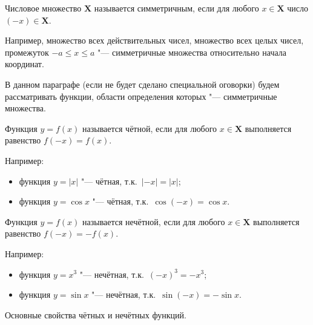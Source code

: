 \begin{Def}
Числовое множество $\mathbf{X}$ называется симметричным, если для любого
$x \in \mathbf{X}$ число $(-x) \in \mathbf{X}$.
\end{Def}

Например, множество всех действительных чисел, множество всех целых чисел,
промежуток $-a \leqslant x \leqslant a$ "--- симметричные множества
относительно начала координат.

В данном параграфе (если не будет сделано специальной оговорки) будем
рассматривать функции, области определения которых "---
симметричные множества.

\begin{Def}
Функция $y = f(x)$ называется чётной, если для любого $x \in \mathbf{X}$
выполняется равенство $f(-x) = f(x)$.
\end{Def}
Например:
\begin{itemize}
\item функция $y = |x|$ "--- чётная, т.к.\ $|-x| = |x|$;
\item функция $y = \cos x$ "--- чётная, т.к.\ $\cos (-x) = \cos x$.
\end{itemize}

\begin{Def}
Функция $y = f(x)$ называется нечётной, если для любого $x \in \mathbf{X}$
выполняется равенство $f(-x) = -f(x)$.
\end{Def}
Например:
\begin{itemize}
\item функция $y = x^{3}$ "--- нечётная, т.к.\ $(-x)^{3} = -x^{3}$;
\item функция $y = \sin x$ "--- нечётная, т.к.\ $\sin (-x) = -\sin x$.
\end{itemize}

Основные свойства чётных и нечётных функций.


